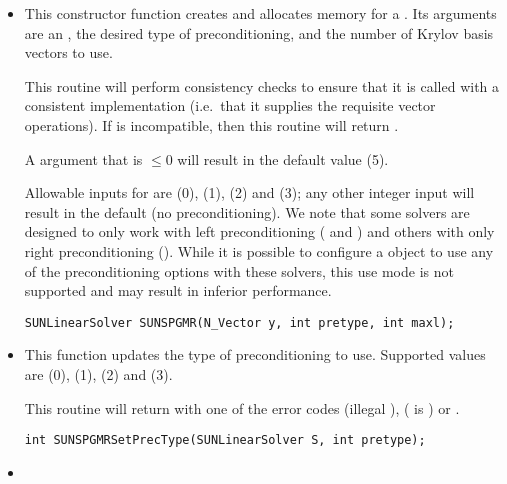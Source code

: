 \begin{itemize}


\item {}

  This constructor function creates and allocates memory for a {\spgmr}
  .  Its arguments are an {\nvector}, the desired
  type of preconditioning, and the number of Krylov basis vectors to use.

  This routine will perform consistency checks to ensure that it is
  called with a consistent {\nvector} implementation (i.e.~that it
  supplies the requisite vector operations).  If  is
  incompatible, then this routine will return .

  A  argument that is $\le0$ will result in the default
  value (5).

  Allowable inputs for  are  (0),
   (1),  (2) and  (3);
  any other integer input will result in the default (no
  preconditioning).
  We note that some {\sundials} solvers are designed to only work
  with left preconditioning ({\ida} and {\idas}) and others with only
  right preconditioning ({\kinsol}). While it is possible to configure
  a {\sunlinsolspgmr} object to use any of the preconditioning options
  with these solvers, this use mode is not supported and may result in
  inferior performance.

  \verb|SUNLinearSolver SUNSPGMR(N_Vector y, int pretype, int maxl);|


\item {}

  This function updates the type of preconditioning to use.  Supported
  values are  (0),  (1),
   (2) and  (3).  

  This routine will return with one of the error codes
   (illegal ), 
  ( is ) or .
  
  \verb|int SUNSPGMRSetPrecType(SUNLinearSolver S, int pretype);|


\item {}


\end{itemize}
